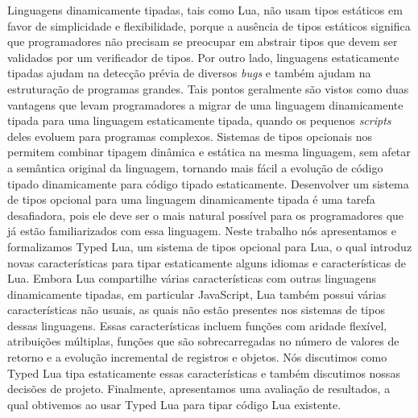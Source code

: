 Linguagens dinamicamente tipadas, tais como Lua, não usam tipos estáticos em
favor de simplicidade e flexibilidade, porque a ausência de tipos estáticos
significa que programadores não precisam se preocupar em abstrair tipos que
devem ser validados por um verificador de tipos.
Por outro lado, linguagens estaticamente tipadas ajudam na detecção prévia de
diversos \emph{bugs} e também ajudam na estruturação de programas grandes.
Tais pontos geralmente são vistos como duas vantagens que levam programadores
a migrar de uma linguagem dinamicamente tipada para uma linguagem estaticamente tipada,
quando os pequenos \emph{scripts} deles evoluem para programas complexos.
Sistemas de tipos opcionais nos permitem combinar tipagem dinâmica e estática na
mesma linguagem, sem afetar a semântica original da linguagem, tornando mais
fácil a evolução de código tipado dinamicamente para código tipado estaticamente.
Desenvolver um sistema de tipos opcional para uma linguagem dinamicamente tipada é
uma tarefa desafiadora, pois ele deve ser o mais natural possível para os programadores
que já estão familiarizados com essa linguagem.
Neste trabalho nós apresentamos e formalizamos Typed Lua, um sistema de tipos opcional
para Lua, o qual introduz novas características para tipar estaticamente alguns idiomas
e características de Lua.
Embora Lua compartilhe várias características com outras linguagens dinamicamente
tipadas, em particular JavaScript, Lua também possui várias características não usuais,
as quais não estão presentes nos sistemas de tipos dessas linguagens.
Essas características incluem funções com aridade flexível, atribuições múltiplas,
funções que são sobrecarregadas no número de valores de retorno e
a evolução incremental de registros e objetos.
Nós discutimos como Typed Lua tipa estaticamente essas características e
também discutimos nossas decisões de projeto.
Finalmente, apresentamos uma avaliação de resultados,
a qual obtivemos ao usar Typed Lua para tipar código Lua existente.
